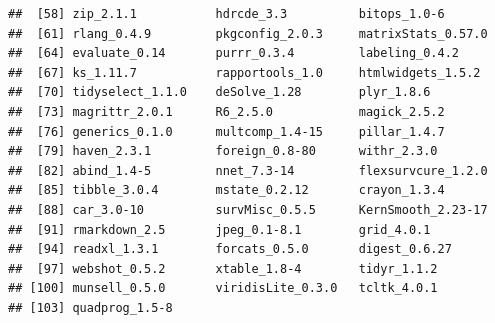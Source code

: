 \documentclass[]{article}
\begin{document}
\begin{verbatim}
##  [58] zip_2.1.1           hdrcde_3.3          bitops_1.0-6       
##  [61] rlang_0.4.9         pkgconfig_2.0.3     matrixStats_0.57.0 
##  [64] evaluate_0.14       purrr_0.3.4         labeling_0.4.2     
##  [67] ks_1.11.7           rapportools_1.0     htmlwidgets_1.5.2  
##  [70] tidyselect_1.1.0    deSolve_1.28        plyr_1.8.6         
##  [73] magrittr_2.0.1      R6_2.5.0            magick_2.5.2       
##  [76] generics_0.1.0      multcomp_1.4-15     pillar_1.4.7       
##  [79] haven_2.3.1         foreign_0.8-80      withr_2.3.0        
##  [82] abind_1.4-5         nnet_7.3-14         flexsurvcure_1.2.0 
##  [85] tibble_3.0.4        mstate_0.2.12       crayon_1.3.4       
##  [88] car_3.0-10          survMisc_0.5.5      KernSmooth_2.23-17 
##  [91] rmarkdown_2.5       jpeg_0.1-8.1        grid_4.0.1         
##  [94] readxl_1.3.1        forcats_0.5.0       digest_0.6.27      
##  [97] webshot_0.5.2       xtable_1.8-4        tidyr_1.1.2        
## [100] munsell_0.5.0       viridisLite_0.3.0   tcltk_4.0.1        
## [103] quadprog_1.5-8
\end{verbatim}
\end{document}
